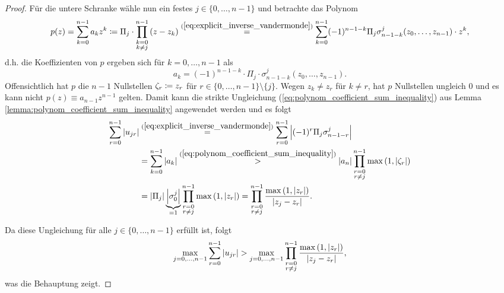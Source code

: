\begin{proof}
    \noindent Für die untere Schranke wähle nun ein festes
    $j \in \{0, \dots, n-1\}$ und betrachte das Polynom
    \[
        p(z) = \sum_{k=0}^{n-1} a_k z^k
        \coloneqq \Pi_j \cdot \prod_{\substack{k=0\\ k \neq j}}^{n-1} \left( z - z_k \right)
        \overset{(\ref{eq:explicit_inverse_vandermonde})}{=} \sum_{k=0}^{n-1} (-1)^{n-1-k} \Pi_j \sigma_{n-1-k}^j(z_0, \dots, z_{n-1}) \cdot z^k,
    \]
    d.h. die Koeffizienten von $p$ ergeben sich für $k = 0, \dots, n-1$ als
    \[
        a_k = (-1)^{n-1-k} \cdot \Pi_j \cdot \sigma_{n-1-k}^j(z_0, \dots, z_{n-1}).
    \]
    Offensichtlich hat $p$ die $n-1$ Nullstellen
    $\zeta_r \coloneqq z_r$ für $r \in \{0,\dots,n-1\} \setminus \{j\}$.
    Wegen $z_k \neq z_r$ für $k \neq r$, hat $p$ Nullstellen ungleich $0$ und
    es kann nicht $p(z) \equiv a_{n-1} z^{n-1}$ gelten.
    Damit kann die strikte Ungleichung
    (\ref{eq:polynom_coefficient_sum_inequality}) aus Lemma
    \ref{lemma:polynom_coefficient_sum_inequality} angewendet werden und es
    folgt
    \[
        \begin{split}
            \sum_{r=0}^{n-1} \left\lvert u_{jr} \right\rvert
            &\overset{(\ref{eq:explicit_inverse_vandermonde})}{=}
            \sum_{r=0}^{n-1} \left\lvert (-1)^r \Pi_j \sigma_{n-1-r}^j \right\rvert\\
            &= \sum_{k=0}^{n-1} \left\lvert a_k \right\rvert
            \overset{(\ref{eq:polynom_coefficient_sum_inequality})}{>}
                \left\lvert a_{n} \right\rvert \prod_{\substack{r=0\\ r \neq j}}^{n-1} \max \left(1, \left\lvert \zeta_r \right\rvert \right)\\
            &= \left\lvert \Pi_j \right\rvert \underbrace{\left\lvert \sigma_0^j \right\rvert}_{=1} \prod_{\substack{r=0\\ r \neq j}}^{n-1} \max \left(1, \left\lvert z_r \right\rvert \right)
            = \prod_{\substack{r=0\\ r \neq j}}^{n-1} \frac{\max \left(1, \left\lvert z_r \right\rvert \right)}{\left\lvert z_j - z_r \right\rvert}.
        \end{split}
    \]

    \noindent Da diese Ungleichung für alle $j \in \{0, \dots, n-1\}$ erfüllt ist, folgt
    \[
        \max_{j = 0, \dots, n-1} \sum_{r=0}^{n-1} \left\lvert u_{jr} \right\rvert
        > \max_{j = 0, \dots, n-1} \prod_{\substack{r=0\\ r \neq j}}^{n-1} \frac{\max \left(1, \left\lvert z_r \right\rvert \right)}{\left\lvert z_j - z_r \right\rvert},
    \]
    was die Behauptung zeigt.
\end{proof}

